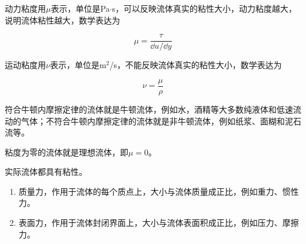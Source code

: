 
动力粘度用$\mu$表示，单位是Pa$\cdot$s，可以反映流体真实的粘性大小，动力粘度越大，说明流体粘性越大，数学表达为

\begin{equation}
	\mu = \dfrac{\tau}{\dd{u}/\dd{y}}
\end{equation}

运动粘度用$\nu$表示，单位是m$^2$/s，不能反映流体真实的粘性大小，数学表达为

\begin{equation}
	\nu = \dfrac{\mu}{\rho}
\end{equation}


\begin{definition}[牛顿流体和非牛顿流体]
	符合牛顿内摩擦定律的流体就是牛顿流体，例如水，酒精等大多数纯液体和低速流动的气体；不符合牛顿内摩擦定律的流体就是非牛顿流体，例如纸浆、面糊和泥石流等。
\end{definition}


\begin{definition}[理想流体]
	粘度为零的流体就是理想流体，即$\mu = 0$。
\end{definition}

实际流体都具有粘性。


\begin{enumerate}
	\item 质量力，作用于流体的每个质点上，大小与流体质量成正比，例如重力、惯性力。
	\item 表面力，作用于流体封闭界面上，大小与流体表面积成正比，例如压力、摩擦力。
\end{enumerate}